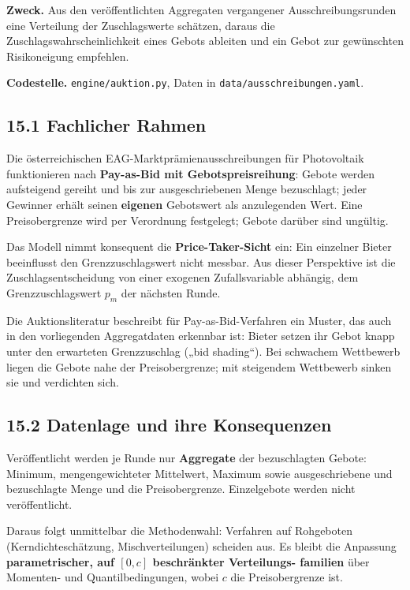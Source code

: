 \documentclass[
  a4paper,
  10pt]{article}
\begin{document}
\textbf{Zweck.} Aus den veröffentlichten Aggregaten vergangener
Ausschreibungsrunden eine Verteilung der Zuschlagswerte schätzen, daraus
die Zuschlagswahrscheinlichkeit eines Gebots ableiten und ein Gebot zur
gewünschten Risikoneigung empfehlen.

\textbf{Codestelle.} \nolinkurl{engine/auktion.py}, Daten in
\nolinkurl{data/ausschreibungen.yaml}.

\hypertarget{fachlicher-rahmen}{%
\subsection{15.1 Fachlicher Rahmen}\label{fachlicher-rahmen}}

Die österreichischen EAG-Marktprämienausschreibungen für Photovoltaik
funktionieren nach \textbf{Pay-as-Bid mit Gebotspreisreihung}: Gebote
werden aufsteigend gereiht und bis zur ausgeschriebenen Menge
bezuschlagt; jeder Gewinner erhält seinen \textbf{eigenen} Gebotswert
als anzulegenden Wert. Eine Preisobergrenze wird per Verordnung
festgelegt; Gebote darüber sind ungültig.

Das Modell nimmt konsequent die \textbf{Price-Taker-Sicht} ein: Ein
einzelner Bieter beeinflusst den Grenzzuschlagswert nicht messbar. Aus
dieser Perspektive ist die Zuschlagsentscheidung von einer exogenen
Zufallsvariable abhängig, dem Grenzzuschlagswert \(p_m\) der nächsten
Runde.

Die Auktionsliteratur beschreibt für Pay-as-Bid-Verfahren ein Muster,
das auch in den vorliegenden Aggregatdaten erkennbar ist: Bieter setzen
ihr Gebot knapp unter den erwarteten Grenzzuschlag („bid shading``). Bei
schwachem Wettbewerb liegen die Gebote nahe der Preisobergrenze; mit
steigendem Wettbewerb sinken sie und verdichten sich.

\hypertarget{datenlage-und-ihre-konsequenzen}{%
\subsection{15.2 Datenlage und ihre
Konsequenzen}\label{datenlage-und-ihre-konsequenzen}}

Veröffentlicht werden je Runde nur \textbf{Aggregate} der bezuschlagten
Gebote: Minimum, mengengewichteter Mittelwert, Maximum sowie
ausgeschriebene und bezuschlagte Menge und die Preisobergrenze.
Einzelgebote werden nicht veröffentlicht.

Daraus folgt unmittelbar die Methodenwahl: Verfahren auf Rohgeboten
(Kerndichteschätzung, Mischverteilungen) scheiden aus. Es bleibt die
Anpassung \textbf{parametrischer, auf \([0, c]\) beschränkter
Verteilungs- familien} über Momenten- und Quantilbedingungen, wobei
\(c\) die Preisobergrenze ist.
\end{document}
